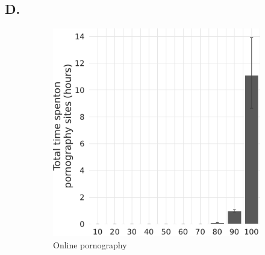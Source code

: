 \documentclass[12pt,twoside]{article}
\begin{document}
\subsection{D. \smDTitle{}}\label{sm:smD}
\begin{figure}[!ht]
\label{fig:distribution_duration_on_adultsites_fullsample_mar}
     \centering
     \begin{subfigure}[b]{0.495\textwidth}
         \centering
         \includegraphics[width=\textwidth]{figs/mar/distribution_duration_on_adultsites_fullsample.pdf}
         \caption{Online pornography}
     \end{subfigure}
     \hfill
     \begin{subfigure}[b]{0.495\textwidth}
         \centering

\end{subfigure}
\end{figure}
\end{document}
